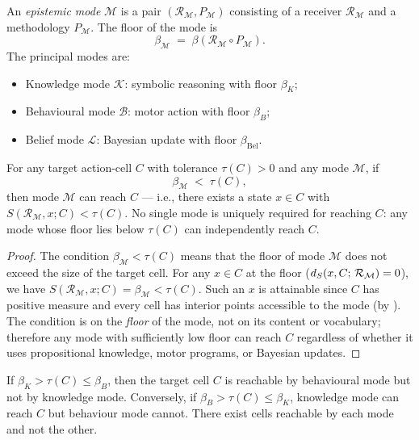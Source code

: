 \begin{definition}
\label{def:epistemic-mode}
An \emph{epistemic mode} $\mathcal{M}$ is a pair $(\mathcal{R}_\mathcal{M},
P_\mathcal{M})$ consisting of a receiver $\mathcal{R}_\mathcal{M}$ and a
methodology $P_\mathcal{M}$.  The floor of the mode is
\[
  \beta_\mathcal{M} \;=\; \beta(\mathcal{R}_\mathcal{M} \circ P_\mathcal{M}) .
\]
The principal modes are:
\begin{itemize}
  \item Knowledge mode $\mathcal{K}$: symbolic reasoning with floor $\beta_K$;
  \item Behavioural mode $\mathcal{B}$: motor action with floor $\beta_B$;
  \item Belief mode $\mathcal{L}$: Bayesian update with floor $\beta_{\mathrm{Bel}}$.
\end{itemize}
\end{definition}

\begin{theorem}
\label{thm:mode-nonprovilege}
For any target action-cell $C$ with tolerance $\tau(C) > 0$ and any mode
$\mathcal{M}$, if
\[
  \beta_\mathcal{M} \;<\; \tau(C) ,
\]
then mode $\mathcal{M}$ can reach $C$ — i.e., there exists a state $x \in C$
with $S(\mathcal{R}_\mathcal{M}, x; C) < \tau(C)$.  No single mode is
uniquely required for reaching $C$: any mode whose floor lies below $\tau(C)$
can independently reach $C$.
\end{theorem}

\begin{proof}
The condition $\beta_\mathcal{M} < \tau(C)$ means that the floor of mode
$\mathcal{M}$ does not exceed the size of the target cell.  For any $x \in C$
at the floor ($d_S(x, C;\, \mathcal{R}_\mathcal{M}) = 0$), we have
$S(\mathcal{R}_\mathcal{M}, x; C) = \beta_\mathcal{M} < \tau(C)$.  Such an
$x$ is attainable since $C$ has positive measure and every cell has interior
points accessible to the mode (by ).  The condition is
on the \emph{floor} of the mode, not on its content or vocabulary; therefore
any mode with sufficiently low floor can reach $C$ regardless of whether it
uses propositional knowledge, motor programs, or Bayesian updates.
\end{proof}

\begin{corollary}
\label{cor:knowledge-not-unique}
If $\beta_K > \tau(C) \leq \beta_B$, then the target cell $C$ is reachable
by behavioural mode but not by knowledge mode.  Conversely, if
$\beta_B > \tau(C) \leq \beta_K$, knowledge mode can reach $C$ but behaviour
mode cannot.  There exist cells reachable by each mode and not the other.
\end{corollary}

